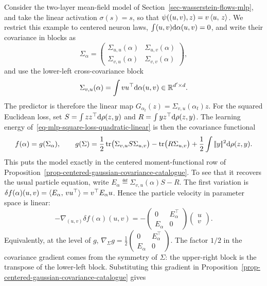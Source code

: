 \begin{example}
	Consider the two-layer mean-field model of Section~\ref{sec-wasserstein-flows-mlp}, and take the linear activation $\sigma(s)=s$, so that $\psi((u,v),z)=v\,\langle u,\,z\rangle$.
	We restrict this example to centered neuron laws, $\int (u,v)\mathrm{d}\alpha(u,v)=0$, and write their covariance in blocks as
	\[
		\Sigma_\alpha=
		\begin{pmatrix}
			\Sigma_{u,u}(\alpha) & \Sigma_{u,v}(\alpha)\\
			\Sigma_{v,u}(\alpha) & \Sigma_{v,v}(\alpha)
		\end{pmatrix},
	\]
	and use the lower-left cross-covariance block
	\[
		\Sigma_{v,u}(\alpha)=\int v u^\top\mathrm{d}\alpha(u,v)\in\mathbb{R}^{d'\times d}.
	\]
	The predictor is therefore the linear map $G_{\alpha_t}(z)=\Sigma_{v,u}(\alpha_t)z$. For the squared Euclidean loss, set $S=\int zz^\top\mathrm{d}\rho(z,y)$ and $R=\int y z^\top\mathrm{d}\rho(z,y)$.
	The learning energy of~\eqref{eq-mlp-square-loss-quadratic-linear} is then the covariance functional
	\[
		f(\alpha)=g(\Sigma_\alpha),
		\qquad
		g(\Sigma)
		=
		\frac12\operatorname{tr}\!\big(\Sigma_{v,u}S\Sigma_{u,v}\big)
		-\operatorname{tr}\!\big(R\Sigma_{u,v}\big)
		+\frac12\int|\!| y |\!|^2\mathrm{d}\rho(z,y).
	\]
	This puts the model exactly in the centered moment-functional row of Proposition~\ref{prop-centered-gaussian-covariance-catalogue}. To see that it recovers the usual particle equation, write $E_\alpha\eqdef \Sigma_{v,u}(\alpha)S-R$. The first variation is $\delta f(\alpha)(u,v)=\langle E_\alpha,\,v u^\top\rangle=v^\top E_\alpha u$.
	Hence the particle velocity in parameter space is linear:
	\[
		-\nabla_{(u,v)}\delta f(\alpha)(u,v)
		=
		-\begin{pmatrix}
			0 & E_\alpha^\top \\
			E_\alpha & 0
		\end{pmatrix}
		\begin{pmatrix} u \\ v \end{pmatrix}.
	\]
	Equivalently, at the level of $g$, \(\nabla_\Sigma g=\frac12\begin{pmatrix}0 & E_\alpha^\top\\ E_\alpha & 0\end{pmatrix}\).
	The factor \(1/2\) in the covariance gradient comes from the symmetry of \(\Sigma\): the upper-right block is the transpose of the lower-left block. Substituting this gradient in Proposition~\ref{prop-centered-gaussian-covariance-catalogue} gives

\end{example}
